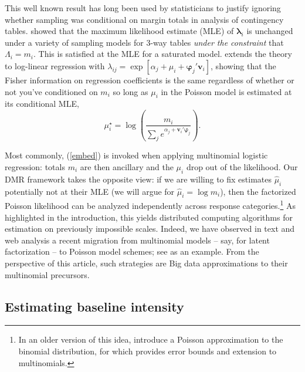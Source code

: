 \documentclass[12pt]{article}
\newcommand{\bs}[1]{\boldsymbol{#1}}
\newcommand{\bm}[1]{\mathbf{#1}}
\begin{document}
This well known result has long been used by statisticians to justify ignoring
whether sampling was conditional on margin totals in analysis of contingency
tables. \cite{birch_maximum_1963} showed that the maximum likelihood estimate
(MLE) of $\bs{\lambda}_i$ is unchanged under a variety of sampling models for
3-way tables {\it under the constraint} that $\Lambda_{i} = m_i$. This is
satisfied at the MLE for a saturated model. \cite{palmgren_fisher_1981}
extends the theory to log-linear regression with $\lambda_{ij} = \exp[\alpha_j
+ \mu_i + \bs{\varphi}_j'\bm{v}_i]$, showing that the Fisher information on
  regression coefficients is the same regardless of whether or not you've
  conditioned on $m_i$  so long as $\mu_i$ in the Poisson model is estimated
  at its conditional MLE, 
 \begin{equation} \label{mlemu}
  \mu_i^\star =
\log\left(\frac{m_i}{\sum_j e^{\alpha_j + \bm{v}_i'\bs{\varphi}_j}}\right).  
\end{equation}

Most commonly, (\ref{embed}) is invoked when applying multinomial logistic
regression: totals $m_i$ are then ancillary and the $\mu_i$ drop out of the
likelihood.  Our DMR framework takes the opposite view: if we are willing to
fix estimates $\hat\mu_i$ potentially not at their MLE (we will argue for
$\hat\mu_i = \log m_i$), then the factorized Poisson likelihood can be
analyzed independently across response categories.\footnote{In an older version
of this idea, \cite{hodges_poisson_1960} introduce a Poisson approximation
to the binomial distribution, for which
\cite{mcdonald_poisson_1980} provides error bounds and extension to
multinomials.} As highlighted in the introduction, this yields distributed
computing algorithms for estimation on previously impossible scales.  Indeed,
we have observed in text and web analysis a recent migration from multinomial
models -- say, for latent factorization -- to Poisson model schemes; see
\citet{gopalan_scalable_2013} as an example.  From the perspective of this
article, such strategies are Big data approximations to their
multinomial precursors.


\subsection{Estimating baseline intensity}
\label{MU}
\end{document}
